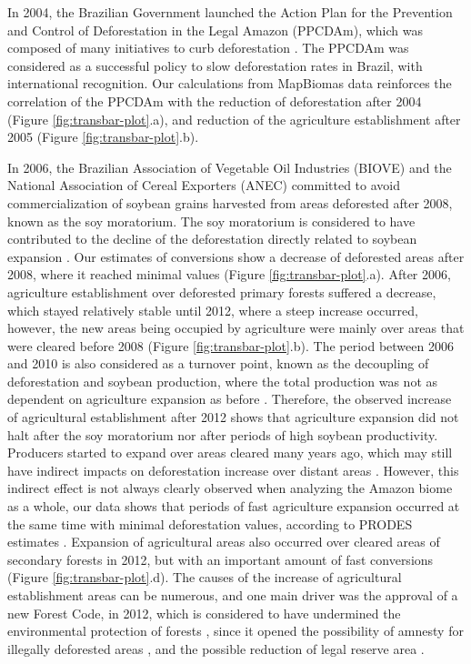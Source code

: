 \documentclass[essd, manuscript]{copernicus}
\begin{document}
In 2004, the Brazilian Government launched the Action Plan for the Prevention and Control of Deforestation in the Legal Amazon (PPCDAm), which was composed of many initiatives to curb deforestation \citep{West2021}.
The PPCDAm was considered as a successful policy to slow deforestation rates in Brazil, with international recognition.
Our calculations from MapBiomas data reinforces the correlation of the PPCDAm with the reduction of deforestation after 2004 (Figure \ref{fig:transbar-plot}.a), and reduction of the agriculture establishment after 2005 (Figure \ref{fig:transbar-plot}.b).

In 2006, the Brazilian Association of Vegetable Oil Industries (BIOVE) and the National Association of Cereal Exporters (ANEC) committed to avoid commercialization of soybean grains harvested from areas deforested after 2008, known as the soy moratorium.
The soy moratorium is considered to have contributed to the decline of the deforestation directly related to soybean expansion \citep{Paim2021, Amaral2021, Heilmayr2020, Kastens2017}. Our estimates of conversions show a decrease of deforested areas after 2008, where it reached minimal values (Figure \ref{fig:transbar-plot}.a). After 2006, agriculture establishment over deforested primary forests suffered a decrease, which stayed relatively stable until 2012, where a steep increase occurred, however, the new areas being occupied by agriculture were mainly over areas that were cleared before 2008 (Figure \ref{fig:transbar-plot}.b). The period between 2006 and 2010 is also considered as a turnover point, known as the decoupling of deforestation and soybean production, where the total production was not as dependent on agriculture expansion as before \citep{Macedo2012}. Therefore, the observed increase of agricultural establishment after 2012 shows that agriculture expansion did not halt after the soy moratorium nor after periods of high soybean productivity. Producers started to expand over areas cleared many years ago, which may still have indirect impacts on deforestation increase over distant areas \citep{Arima2011, Gollnow2018}. However, this indirect effect is not always clearly observed when analyzing the Amazon biome as a whole, our data shows that periods of fast agriculture expansion occurred at the same time with minimal deforestation values, according to PRODES estimates \citep{Assis2019}. Expansion of agricultural areas also occurred over cleared areas of secondary forests in 2012, but with an important amount of fast conversions (Figure \ref{fig:transbar-plot}.d). The causes of the increase of agricultural establishment areas can be numerous, and one main driver was the approval of a new Forest Code, in 2012, which is considered to have undermined the environmental protection of forests \citep{Kroger2017, Pereira2019}, since it opened the possibility of amnesty for illegally deforested areas \citep{Schielein2018, Santanna2021, Filho2014}, and the possible reduction of legal reserve area \citep{Freitas2018}.
\end{document}
